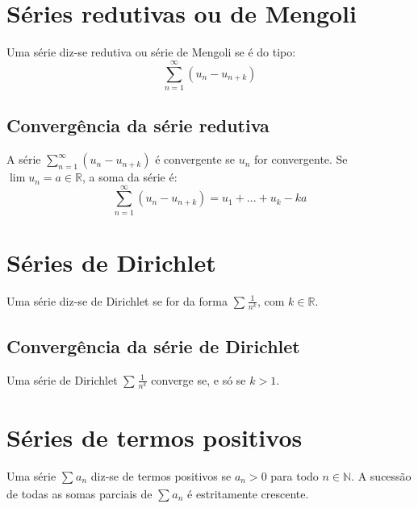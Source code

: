 \documentclass[10pt,a4paper]{report}
\begin{document}
\section{Séries redutivas ou de Mengoli}
Uma série diz-se redutiva ou série de Mengoli se é do tipo:
$$
\sum_{n=1}^{\infty} (u_n - u_{n+k})
$$
\subsection{Convergência da série redutiva}
A série $\sum_{n=1}^{\infty} (u_n - u_{n+k})$ é convergente se $u_n$ for convergente. Se $\lim u_n = a \in \mathbb{R}$, a soma da série é:
$$
\sum_{n=1}^{\infty} (u_n - u_{n+k}) = u_1 + ... + u_k - ka
$$

\section{Séries de Dirichlet}
Uma série diz-se de Dirichlet se for da forma $\sum_{}^{} \frac{1}{n^k}$, com $k \in \mathbb{R}$.
\subsection{Convergência da série de Dirichlet}
Uma série de Dirichlet $\sum_{}^{} \frac{1}{n^k}$ converge se, e só se $k > 1$.

\section{Séries de termos positivos}
Uma série $\sum_{}^{} a_n$ diz-se de termos positivos se $a_n > 0$ para todo $n \in \mathbb{N}$. A sucessão de todas as somas parciais de $\sum_{}^{} a_n$ é estritamente crescente.
\end{document}
